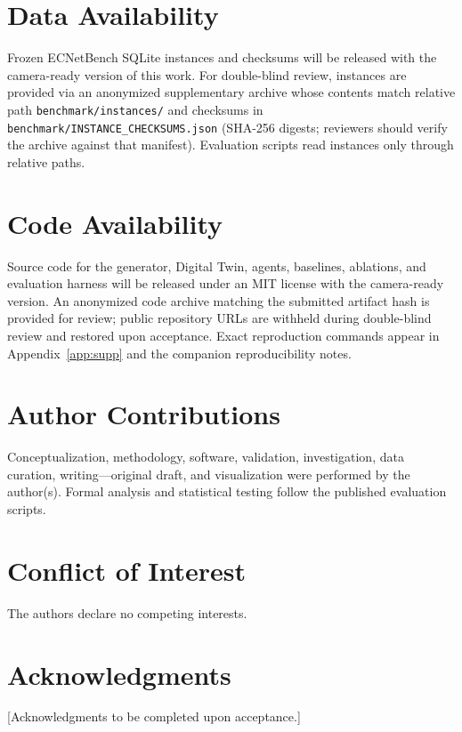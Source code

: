 \documentclass[journal]{IEEEtran}
\begin{document}
\appendices

\FloatBarrier

\section*{Data Availability}
Frozen ECNetBench SQLite instances and checksums will be released with the camera-ready version of this work.
For double-blind review, instances are provided via an anonymized supplementary archive whose contents match relative path \texttt{benchmark/instances/} and checksums in \texttt{benchmark/INSTANCE\_CHECKSUMS.json} (SHA-256 digests; reviewers should verify the archive against that manifest).
Evaluation scripts read instances only through relative paths.

\section*{Code Availability}
Source code for the generator, Digital Twin, agents, baselines, ablations, and evaluation harness will be released under an MIT license with the camera-ready version.
An anonymized code archive matching the submitted artifact hash is provided for review; public repository URLs are withheld during double-blind review and restored upon acceptance.
Exact reproduction commands appear in Appendix~\ref{app:supp} and the companion reproducibility notes.

\section*{Author Contributions}
Conceptualization, methodology, software, validation, investigation, data curation, writing---original draft, and visualization were performed by the author(s). Formal analysis and statistical testing follow the published evaluation scripts.

\section*{Conflict of Interest}
The authors declare no competing interests.

\section*{Acknowledgments}
[Acknowledgments to be completed upon acceptance.]

\clearpage


\end{document}
